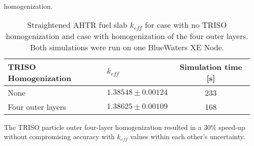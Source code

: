 homogenization.
\begin{table}[]
    \centering
    \onehalfspacing
    \caption{Straightened \acrfull{AHTR} fuel slab $k_{eff}$ for case with 
    no \gls{TRISO} homogenization and case with homogenization of the four outer 
    layers. Both simulations were run on one BlueWaters XE Node.}
	\label{tab:keff_triso}
    \footnotesize
    \begin{tabular}{llc}
    \hline 
    \textbf{TRISO Homogenization}& \textbf{$k_{eff}$} & \textbf{Simulation time [s]}  \\
    \hline 
    None & $1.38548 \pm 0.00124$ & 233\\ 
    Four outer layers & $1.38625 \pm 0.00109$ & 168\\ 
    \hline
    \end{tabular}
\end{table}
The \gls{TRISO} particle outer four-layer homogenization resulted in a $30\%$ 
speed-up without compromising accuracy with $k_{eff}$ values within each 
other's uncertainty.

